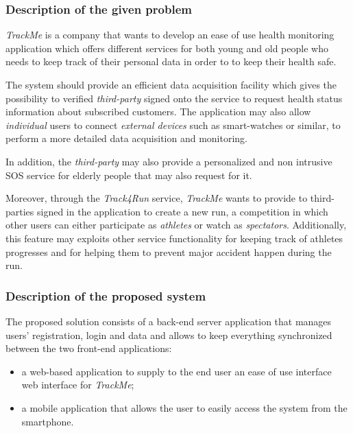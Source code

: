 \documentclass[a4paper]{article}
\begin{document}
        \subsubsection{Description of the given problem}
        \textit{TrackMe} is a company that wants to develop an ease of use health monitoring application which offers different services for both young and old people who needs to keep track of their personal data in order to to keep their health safe.
        
        The system should provide an efficient data acquisition facility which gives the possibility to verified \textit{third-party} signed onto the service to request health status information about subscribed customers. The application may also allow \textit{individual} users to connect \textit{external devices} such as smart-watches or similar, to perform a more detailed data acquisition and monitoring.
        
        In addition, the \textit{third-party} may also provide a personalized and non intrusive SOS service for elderly people that may also request for it.
    
        Moreover, through the \textit{Track4Run} service, \textit{TrackMe} wants to provide to third-parties signed in the application to create a new run, a competition in which other users can either participate as \textit{athletes} or watch as \textit{spectators}. Additionally, this feature may exploits other service functionality for keeping track of athletes progresses and for helping them to prevent major accident happen during the run.
                
        \subsubsection{Description of the proposed system}
        The proposed solution consists of a back-end server application that manages users' registration, login and data and allows to keep everything synchronized between the two front-end applications:
        \begin{itemize}
            \item a web-based application to supply to the end user an ease of use interface web interface for \textit{TrackMe};
            \item a mobile application that allows the user to easily access the system from the smartphone.
        \end{itemize}
        
\end{document}
